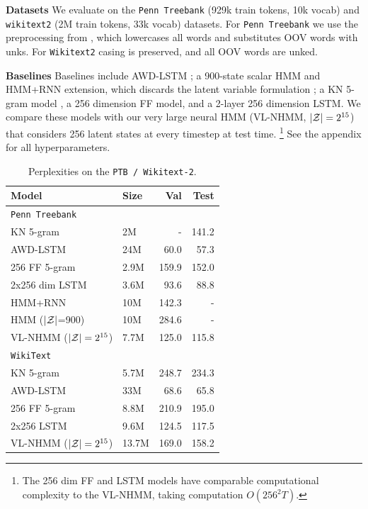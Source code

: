 \documentclass[11pt,a4paper]{article}
\begin{document}
\noindent \textbf{Datasets}
We evaluate on the \texttt{Penn Treebank} \citep{ptb} (929k train tokens, 10k vocab)
and \texttt{wikitext2} \citep{wikitext} (2M train tokens, 33k vocab) datasets.
For \texttt{Penn Treebank} we use the preprocessing from \citet{mikolov-2011},
which lowercases all words and substitutes OOV words with unks. 
For \texttt{Wikitext2} casing is preserved, and all OOV words are unked.

\noindent \textbf{Baselines}
Baselines include AWD-LSTM \citep{merity2017awdlstm};
a 900-state scalar HMM and HMM+RNN extension,
which discards the latent variable formulation \citep{buys2018hmm};
a KN 5-gram model \citep{mikolov2012rnn,kenlm},
a 256 dimension FF model,
and a 2-layer 256 dimension LSTM.
We compare these models with our very large neural HMM (VL-NHMM, $|\mathcal{Z}|=2^{15}$)
that considers 256 latent states at every timestep at test time.
\footnote{
The 256 dim FF and LSTM models have comparable computational complexity to the VL-NHMM,
taking computation $O(256^2 T)$.
}
See the appendix for all hyperparameters.

\begin{table}[!t]
\centering
\begin{tabular}{llrr}
\toprule
Model & Size & Val  & Test \\
\midrule
\texttt{Penn Treebank}\\
\midrule
KN 5-gram   & 2M & - & 141.2\\
AWD-LSTM  & 24M & 60.0 & 57.3\\
256 FF 5-gram  & 2.9M     & 159.9      & 152.0  \\
2x256 dim LSTM  & 3.6M     & 93.6       & 88.8   \\
HMM+RNN   & 10M & 142.3 & -\\
HMM ($|\mathcal{Z}|$=900) & 10M & 284.6 & -\\
VL-NHMM ($|\mathcal{Z}|=2^{15}$)   & 7.7M     & 125.0      & 115.8  \\
\midrule
\texttt{WikiText}\\
\midrule
KN 5-gram & 5.7M       & 248.7 & 234.3\\
AWD-LSTM & 33M & 68.6 & 65.8\\
256 FF 5-gram        & 8.8M    & 210.9  & 195.0\\
2x256  LSTM     & 9.6M    & 124.5  & 117.5\\
VL-NHMM ($|\mathcal{Z}|=2^{15}$)           & 13.7M   & 169.0      & 158.2\\
\bottomrule
\end{tabular}
\caption{\label{tbl:ppl}
Perplexities on the \texttt{PTB / Wikitext-2}.
}
\end{table}
\end{document}
